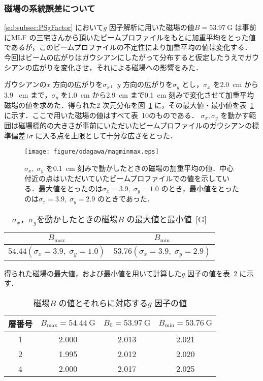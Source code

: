 \subsubsection{磁場の系統誤差について}
\label{subsubsec:MagSysErr}

\ref{subsubsec:PSgFactor} において$g$ 因子解析に用いた磁場の値$B = 53.97~\mathrm{G}$ は事前にMLF の三宅さんから頂いたビームプロファイルをもとに加重平均をとった値であるが，このビームプロファイルの不定性により加重平均の値は変化する．
今回はビームの広がりはガウシアンにしたがって分布すると仮定したうえでガウシアンの広がりを変化させ，それによる磁場への影響をみた．

ガウシアンの$x$ 方向の広がりを$\sigma_{x}$，$y$ 方向の広がりを$\sigma_{y}$ とし，$\sigma_{x}$ を2.0~cm から3.9 ~cm まで，$\sigma_{y}$ を1.0~cm から2.9~cm まで0.1~cm 刻みで変化させて加重平均磁場の値を求めた．得られた2 次元分布を図~\ref{fig:PSMagMinMax} に，その最大値・最小値を表~\ref{tab:MagSysErr} に示す．ここで用いた磁場の値はすべて表~10のものである．
$\sigma_{x}, \sigma_{y}$ を動かす範囲は磁場標的の大きさが事前にいただいたビームプロファイルのガウシアンの標準偏差$1\sigma$ に入る点を上限として十分な広さをとった．
\begin{figure}[h]
	\centering
	\texttt{[image: figure/odagawa/magminmax.eps]}
	\caption{$\sigma_{x}, \;\sigma_{y}$ を0.1~cm 刻みで動かしたときの磁場の加重平均の値．中心付近の点はいただいていたビームプロファイルでの値を示している．最大値をとったのは$\sigma_{x} = 3.9, \;\sigma_{y} = 1.0$ のとき，最小値をとったのは$\sigma_{x} = 3.9, \;\sigma_{y} = 2.9$ のときであった．}
	\label{fig:PSMagMinMax}
\end{figure}
\begin{table}[h]
	\centering
	\caption{$\sigma_{x}$，$\sigma_{y}$を動かしたときの磁場$B$ の最大値と最小値~[G]}
	\begin{tabular}{cc}\toprule
	$B_{\mathrm{max}}$ & $B_{\mathrm{min}}$ \\ \midrule
	$54.44 (\sigma_{x} = 3.9, \;\sigma_{y} = 1.0)$ & $53.76 (\sigma_{x} = 3.9, \;\sigma_{y} = 2.9)$ \\ \bottomrule 	
	\end{tabular}\label{tab:MagSysErr}
\end{table}%

得られた磁場の最大値，および最小値を用いて計算した$g$ 因子の値を表~\ref{tab:PSgSysErr} に示す．
\begin{table}[h]
	\centering
	\caption{磁場$B$ の値とそれらに対応する$g$ 因子の値}
	\begin{tabular}{cccc}\toprule
	層番号 & $B_{\mathrm{max}} = 54.44~\mathrm{G}$ & $B_{0} = 53.97~\mathrm{G}$ & $B_{\mathrm{min}} = 53.76~\mathrm{G}$ \\ \midrule
	1 & 2.000 & 2.013 & 2.021 \\
	2 & 1.995 & 2.012 & 2.020 \\
	4 & 2.000 & 2.017 & 2.025 \\ \bottomrule 
	\end{tabular}\label{tab:PSgSysErr}
\end{table}%

